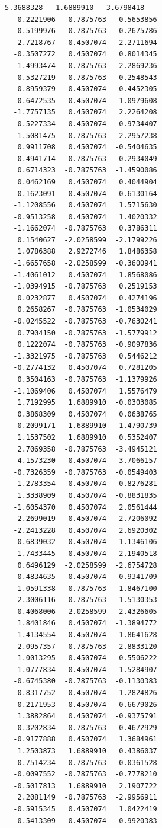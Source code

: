 \documentclass[11pt]{article}
\begin{document}
\begin{Verbatim}[commandchars=\\\{\}]
   5.3688328   1.6889910  -3.6798418
  -0.2221906  -0.7875763  -0.5653856
  -0.5199976  -0.7875763  -0.2675786
   2.7218767   0.4507074  -2.2711694
  -0.3507272   0.4507074   0.8014345
   1.4993474  -0.7875763  -2.2869236
  -0.5327219  -0.7875763  -0.2548543
   0.8959379   0.4507074  -0.4452305
  -0.6472535   0.4507074   1.0979608
  -1.7757135   0.4507074   2.2264208
  -0.5227334   0.4507074   0.9734407
   1.5081475  -0.7875763  -2.2957238
   0.9911708   0.4507074  -0.5404635
  -0.4941714  -0.7875763  -0.2934049
   0.6714323  -0.7875763  -1.4590086
   0.0462169   0.4507074   0.4044904
  -0.1623091   0.4507074   0.6130164
  -1.1208556   0.4507074   1.5715630
  -0.9513258   0.4507074   1.4020332
  -1.1662074  -0.7875763   0.3786311
   0.1540627  -2.0258599  -2.1799226
   1.0786388   2.9272746   1.8486358
  -1.6657658  -2.0258599  -0.3600941
  -1.4061012   0.4507074   1.8568086
  -1.0394915  -0.7875763   0.2519153
   0.0232877   0.4507074   0.4274196
   0.2658267  -0.7875763  -1.0534029
  -0.0245522  -0.7875763  -0.7630241
   0.7904150  -0.7875763  -1.5779912
   0.1222074  -0.7875763  -0.9097836
  -1.3321975  -0.7875763   0.5446212
  -0.2774132   0.4507074   0.7281205
   0.3504163  -0.7875763  -1.1379926
  -1.1069406   0.4507074   1.5576479
   1.7192995   1.6889910  -0.0303085
   0.3868309   0.4507074   0.0638765
   0.2099171   1.6889910   1.4790739
   1.1537502   1.6889910   0.5352407
   2.7069358  -0.7875763  -3.4945121
   4.1573230   0.4507074  -3.7066157
  -0.7326359  -0.7875763  -0.0549403
   1.2783354   0.4507074  -0.8276281
   1.3338909   0.4507074  -0.8831835
  -1.6054370   0.4507074   2.0561444
  -2.2699019   0.4507074   2.7206092
  -2.2413228   0.4507074   2.6920302
  -0.6839032   0.4507074   1.1346106
  -1.7433445   0.4507074   2.1940518
   0.6496129  -2.0258599  -2.6754728
  -0.4834635   0.4507074   0.9341709
   1.0591338  -0.7875763  -1.8467100
  -2.3006116  -0.7875763   1.5130353
   0.4068006  -2.0258599  -2.4326605
   1.8401846   0.4507074  -1.3894772
  -1.4134554   0.4507074   1.8641628
   2.0957357  -0.7875763  -2.8833120
   1.0013295   0.4507074  -0.5506222
  -1.0777834   0.4507074   1.5284907
  -0.6745380  -0.7875763  -0.1130383
  -0.8317752   0.4507074   1.2824826
  -0.2171953   0.4507074   0.6679026
   1.3882864   0.4507074  -0.9375791
  -0.3202834  -0.7875763  -0.4672929
  -0.9177888   0.4507074   1.3684961
   1.2503873   1.6889910   0.4386037
  -0.7514234  -0.7875763  -0.0361528
  -0.0097552  -0.7875763  -0.7778210
  -0.5017813   1.6889910   2.1907722
   2.2081149  -0.7875763  -2.9956911
  -0.5915345   0.4507074   1.0422419
  -0.5413309   0.4507074   0.9920383

\end{Verbatim}
\end{document}
